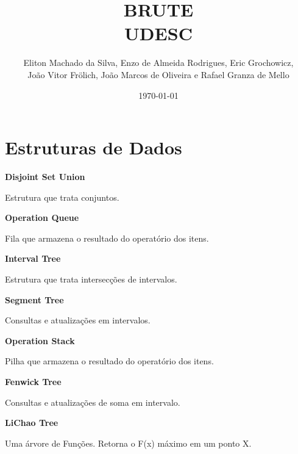 \documentclass[11pt, a4paper, twoside]{book}
\title{BRUTE \\ UDESC}
\author{Eliton Machado da Silva, Enzo de Almeida Rodrigues, Eric Grochowicz, \\ João Vitor Frölich, João Marcos de Oliveira e Rafael Granza de Mello}
\begin{document}
\date{\today}
\maketitle


\renewcommand{\contentsname}{Índice} %
\tableofcontents
\newpage

%
%
%
%

\chapter{Estruturas de Dados}



\textbf{Disjoint Set Union} 



Estrutura que trata conjuntos.





\textbf{Operation Queue} 



Fila que armazena o resultado do operatório dos itens.





\textbf{Interval Tree} 



Estrutura que trata intersecções de intervalos.





\textbf{Segment Tree} 



Consultas e atualizações em intervalos.





\textbf{Operation Stack} 



Pilha que armazena o resultado do operatório dos itens.





\textbf{Fenwick Tree} 



Consultas e atualizações de soma em intervalo.





\textbf{LiChao Tree} 



Uma árvore de Funções. Retorna o F(x) máximo em um ponto X.
\end{document}
